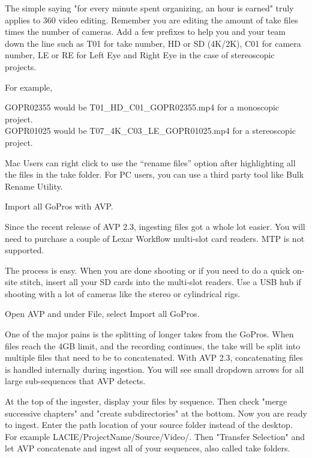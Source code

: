 \begin{fullwidth}
The simple saying "for every minute spent organizing, an hour is earned" truly applies to 360 video editing. Remember you are editing the amount of take files times the number of cameras. Add a few prefixes to help you and your team down the line such as T01 for take number, HD or SD (4K/2K), C01 for camera number, LE or RE for Left Eye and Right Eye in the case of stereoscopic projects.

For example,

GOPR02355 would be T01\_HD\_C01\_GOPR02355.mp4 for a monoscopic project.
\\
GOPR01025 would be T07\_4K\_C03\_LE\_GOPR01025.mp4 for a stereoscopic project.

\tip Mac Users can right click to use the “rename files” option after highlighting all the files in the take folder. For PC users, you can use a third party tool like Bulk Rename Utility.

{\large Import all GoPros with AVP. \par}

Since the recent release of AVP 2.3, ingesting files got a whole lot easier. You will need to purchase a couple of Lexar Workflow multi-slot card readers. MTP is not supported.

The process is easy. When you are done shooting or if you need to do a quick on-site stitch, insert all your SD cards into the multi-slot readers. Use a USB hub if shooting with a lot of cameras like the stereo or cylindrical rigs.

Open AVP and under File, select Import all GoPros.


One of the major pains is the splitting of longer takes from the GoPros. When files reach the 4GB limit, and the recording continues, the take will be split into multiple files that need to be to concatenated. With AVP 2.3, concatenating files is handled internally during ingestion. You will see small dropdown arrows for all large sub-sequences that AVP detects.


At the top of the ingester, display your files by sequence. Then check "merge successive chapters" and "create subdirectories" at the bottom. Now you are ready to ingest. Enter the path location of your source folder instead of the desktop. For example LACIE/ProjectName/Source/Video/. Then "Transfer Selection" and let AVP concatenate and ingest all of your sequences, also called take folders.


\end{fullwidth}

